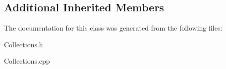 \subsection*{Additional Inherited Members}


The documentation for this class was generated from the following files\+:\begin{DoxyCompactItemize}
\item 
Collections.\+h\item 
Collections.\+cpp\end{DoxyCompactItemize}
